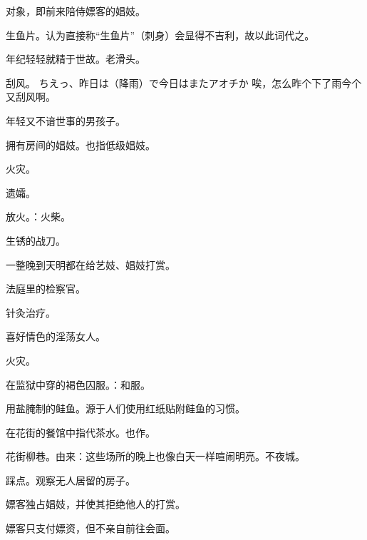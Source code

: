 

\orignextpage

{对象，即前来陪侍嫖客的娼妓。}

{生鱼片。认为直接称“生鱼片”（刺身）会显得不吉利，故以此词代之。}

{年纪轻轻就精于世故。老滑头。} %

{刮风。
  \itemquote
  {ちえっ、昨日は（降雨）で今日はまたアオチか}
{唉，怎么昨个下了雨今个又刮风啊。}}

{年轻又不谙世事的男孩子。}

{拥有房间的娼妓。也指低级娼妓。}

{火灾。}

{遗孀。}

{放火。：火柴。}

{生锈的战刀。}

{一整晚到天明都在给艺妓、娼妓打赏。}

{法庭里的检察官。}

{针灸治疗。}

{喜好情色的淫荡女人。}

{火灾。}

{在监狱中穿的褐色囚服。：和服。}

{用盐腌制的鲑鱼。源于人们使用红纸贴附鲑鱼的习惯。}

{在花街的餐馆中指代茶水。也作。}

{花街柳巷。由来：这些场所的晚上也像白天一样喧闹明亮。不夜城。}

{踩点。观察无人居留的房子。}

{嫖客独占娼妓，并使其拒绝他人的打赏。}

{嫖客只支付嫖资，但不亲自前往会面。}

